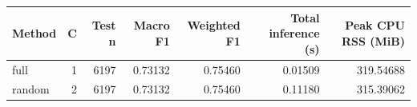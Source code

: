 \begin{tabular}{lrrrrrr}
\toprule
Method & C & Test n & Macro F1 & Weighted F1 & Total inference (s) & Peak CPU RSS (MiB) \\
\midrule
full & 1 & 6197 & 0.73132 & 0.75460 & 0.01509 & 319.54688 \\
random & 2 & 6197 & 0.73132 & 0.75460 & 0.11180 & 315.39062 \\
\bottomrule
\end{tabular}
